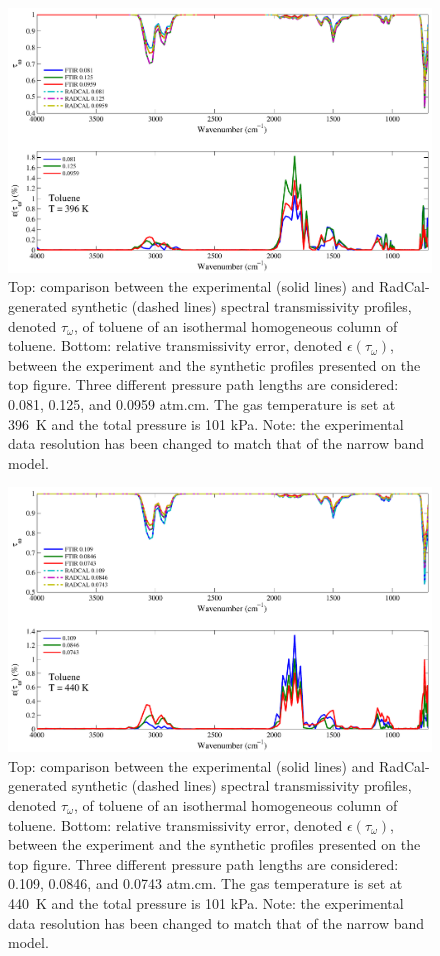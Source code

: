 \begin{figure}[p]
\includegraphics[width=\textwidth]{../Verification/Results_Test2/Toluene_396.pdf}
\caption{Top: comparison between the experimental (solid lines) and RadCal-generated synthetic (dashed lines) spectral transmissivity profiles, denoted $\tau_{\omega}$, of toluene of an isothermal homogeneous column of toluene. Bottom: relative transmissivity error, denoted $\epsilon{(\tau_{\omega})}$, between the experiment and the synthetic profiles presented on the top figure. Three different pressure path lengths are considered: 0.081, 0.125, and 0.0959 atm.cm. The gas temperature is set at 396~K and the total pressure is 101 kPa. Note: the experimental data resolution has been changed to match that of the narrow band model. \label{fig:toluene_Verify_396K}}
\end{figure}

\begin{figure}[p]
\includegraphics[width=\textwidth]{../Verification/Results_Test2/Toluene_440.pdf}
\caption{Top: comparison between the experimental (solid lines) and RadCal-generated synthetic (dashed lines) spectral transmissivity profiles, denoted $\tau_{\omega}$, of toluene of an isothermal homogeneous column of toluene. Bottom: relative transmissivity error, denoted $\epsilon{(\tau_{\omega})}$, between the experiment and the synthetic profiles presented on the top figure. Three different pressure path lengths are considered: 0.109, 0.0846, and 0.0743 atm.cm. The gas temperature is set at 440~K and the total pressure is 101 kPa. Note: the experimental data resolution has been changed to match that of the narrow band model. \label{fig:toluene_Verify_440K}}
\end{figure}


